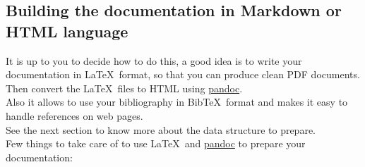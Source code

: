 \subsection{Building the documentation in Markdown or HTML language}

It is up to you to decide how to do this, a good idea is to write your documentation in \LaTeX\ format, so that you can produce clean PDF documents. 
Then convert the \LaTeX\ files to HTML using \href{https://pandoc.org/}{pandoc}. \\
Also it allows to use your bibliography in Bib\TeX\ format and makes it easy to handle references on web pages. \\[0.25cm]
See the next section to know more about the data structure to prepare. \\[0.25cm]
Few things to take care of to use \LaTeX\ and \href{https://pandoc.org/}{pandoc} to prepare your documentation:
